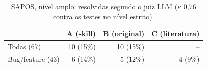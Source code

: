 \begin{table}[t]
\caption{SAPOS, nível amplo: resolvidas segundo o juiz LLM ($\kappa$ 0,76 contra os testes no nível estrito).}
\label{tab:sapos-amplo}
\small
\begin{tabular}{lrrr}
\toprule
 & A (skill) & B (original) & C (literatura) \\
\midrule
Todas (67) & 10 (15\%) & 10 (15\%) & -- \\
Bug/feature (43) & 6 (14\%) & 5 (12\%) & 4 (9\%) \\
\bottomrule
\end{tabular}
\end{table}

